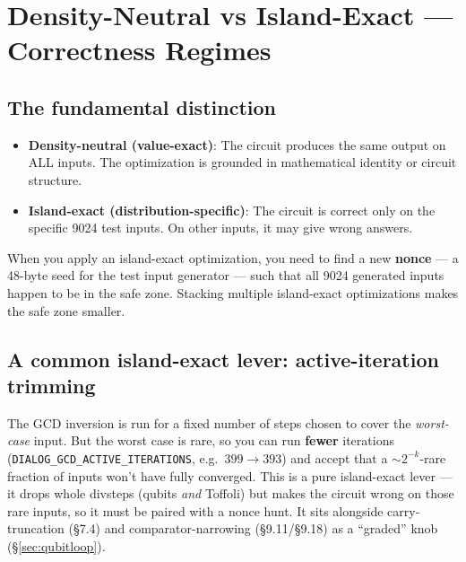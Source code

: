 \documentclass[11pt,a4paper]{article}
\begin{document}
\section{Density-Neutral vs Island-Exact --- Correctness Regimes}
\label{sec:density}

\subsection{The fundamental distinction}

\begin{itemize}
  \item \textbf{Density-neutral (value-exact)}: The circuit produces the same output on ALL
    inputs. The optimization is grounded in mathematical identity or circuit structure.
  \item \textbf{Island-exact (distribution-specific)}: The circuit is correct only on the
    specific 9024 test inputs. On other inputs, it may give wrong answers.
\end{itemize}

When you apply an island-exact optimization, you need to find a new \textbf{nonce} --- a 48-byte
seed for the test input generator --- such that all 9024 generated inputs happen to be in the
safe zone. Stacking multiple island-exact optimizations makes the safe zone smaller.

\subsection{A common island-exact lever: active-iteration trimming}

The GCD inversion is run for a fixed number of steps chosen to cover the \emph{worst-case} input. But
the worst case is rare, so you can run \textbf{fewer} iterations
(\texttt{DIALOG\_GCD\_ACTIVE\_ITERATIONS}, e.g.\ $399\to393$) and accept that a $\sim2^{-k}$-rare
fraction of inputs won't have fully converged. This is a pure island-exact lever --- it drops whole
divsteps (qubits \emph{and} Toffoli) but makes the circuit wrong on those rare inputs, so it must be
paired with a nonce hunt. It sits alongside carry-truncation (\S7.4) and comparator-narrowing
(\S9.11/\S9.18) as a ``graded'' knob (\S\ref{sec:qubitloop}).
\end{document}

